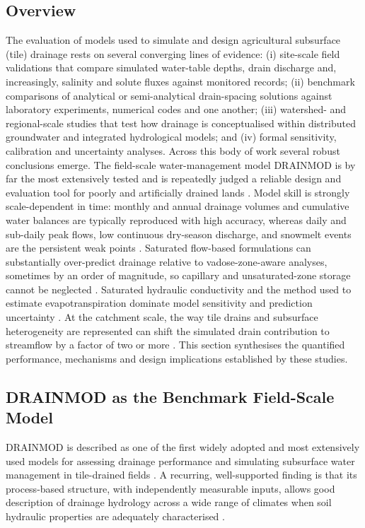 \subsection{Overview}

The evaluation of models used to simulate and design agricultural subsurface (tile) drainage rests on several converging lines of evidence: (i) site-scale field validations that compare simulated water-table depths, drain discharge and, increasingly, salinity and solute fluxes against monitored records; (ii) benchmark comparisons of analytical or semi-analytical drain-spacing solutions against laboratory experiments, numerical codes and one another; (iii) watershed- and regional-scale studies that test how drainage is conceptualised within distributed groundwater and integrated hydrological models; and (iv) formal sensitivity, calibration and uncertainty analyses. Across this body of work several robust conclusions emerge. The field-scale water-management model \textsc{DRAINMOD} is by far the most extensively tested and is repeatedly judged a reliable design and evaluation tool for poorly and artificially drained lands \parencite{Singh2019b,Gowda2012}. Model skill is strongly scale-dependent in time: monthly and annual drainage volumes and cumulative water balances are typically reproduced with high accuracy, whereas daily and sub-daily peak flows, low continuous dry-season discharge, and snowmelt events are the persistent weak points \parencite{Gowda2012,Dayyani2009,Morrison2014,Varvaris2018}. Saturated flow-based formulations can substantially over-predict drainage relative to vadose-zone-aware analyses, sometimes by an order of magnitude, so capillary and unsaturated-zone storage cannot be neglected \parencite{Xin2016b}. Saturated hydraulic conductivity and the method used to estimate evapotranspiration dominate model sensitivity and prediction uncertainty \parencite{NabiSichani2012,Malakshahi2020,Wang2006}. At the catchment scale, the way tile drains and subsurface heterogeneity are represented can shift the simulated drain contribution to streamflow by a factor of two or more \parencite{Karan2021,Boico2022}. This section synthesises the quantified performance, mechanisms and design implications established by these studies.

\subsection{DRAINMOD as the Benchmark Field-Scale Model}

\textsc{DRAINMOD} is described as one of the first widely adopted and most extensively used models for assessing drainage performance and simulating subsurface water management in tile-drained fields \parencite{Singh2019b}. A recurring, well-supported finding is that its process-based structure, with independently measurable inputs, allows good description of drainage hydrology across a wide range of climates when soil hydraulic properties are adequately characterised \parencite{Gowda2012}.

